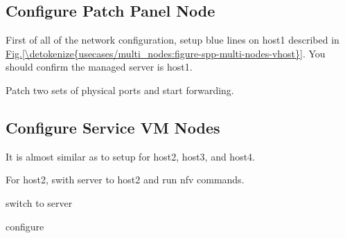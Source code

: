 \documentclass[a4paper,11pt,openany,oneside,english]{sphinxmanual}
\begin{document}
\subsection{Configure Patch Panel Node}
\label{\detokenize{usecases/multi_nodes:configure-patch-panel-node}}
First of all of the network configuration, setup blue lines on host1
described in \hyperref[\detokenize{usecases/multi_nodes:figure-spp-multi-nodes-vhost}]{Fig.\@ \ref{\detokenize{usecases/multi_nodes:figure-spp-multi-nodes-vhost}}}.
You should confirm the managed server is host1.

\begin{sphinxVerbatim}[commandchars=\\\{\},formatcom=\footnotesize]
\end{sphinxVerbatim}

Patch two sets of physical ports and start forwarding.

\begin{sphinxVerbatim}[commandchars=\\\{\},formatcom=\footnotesize]
\end{sphinxVerbatim}


\subsection{Configure Service VM Nodes}
\label{\detokenize{usecases/multi_nodes:configure-service-vm-nodes}}
It is almost similar as
{\hyperref[\detokenize{usecases/spp_nfv:usecase-spp-nfv-l2fwd-vhost-nw}]{}}
to setup for host2, host3, and host4.

For host2, swith server to host2 and run nfv commands.

\begin{sphinxVerbatim}[commandchars=\\\{\},formatcom=\footnotesize]
 switch to server 

 configure
\end{sphinxVerbatim}
\end{document}
